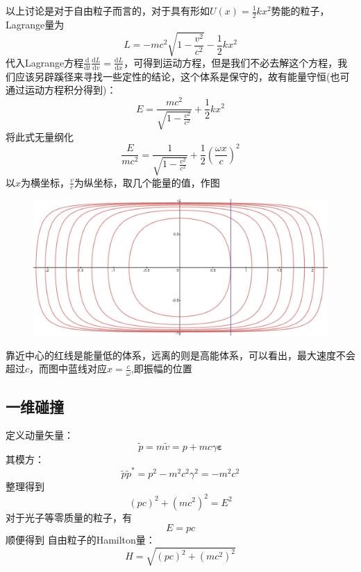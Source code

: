 \documentclass[hyperref,utf8]{ctexart}
\begin{document}
以上讨论是对于自由粒子而言的，对于具有形如$U(x)=\frac12 kx^2$势能的粒子，Lagrange量为\[L=-mc^2\sqrt{1-\frac{v^2}{c^2}}-\frac12 kx^2\]
代入Lagrange方程$\frac{\mathrm{d}}{\mathrm{d}t}\frac{\mathrm{d}L}{\mathrm{d}v}=\frac{\mathrm{d}L}{\mathrm{d}x}$，可得到运动方程，但是我们不必去解这个方程，我们应该另辟蹊径来寻找一些定性的结论，这个体系是保守的，故有能量守恒(也可通过运动方程积分得到)：
\[E=\frac{mc^2}{\sqrt{1-\frac{v^2}{c^2}}}+\frac12 kx^2\]
将此式无量纲化
\[\frac{E}{mc^2}=\frac{1}{\sqrt{1-\frac{v^2}{c^2}}}+ \frac12 (\frac{\omega x}{c})^2\]
以$x$为横坐标，$\frac{v}{c}$为纵坐标，取几个能量的值，作图
\begin{figure}[H]
    \centering
    \includegraphics[scale=0.4]{2020-08-26 224653.png}
\end{figure}
靠近中心的红线是能量低的体系，远离的则是高能体系，可以看出，最大速度不会超过$c$，而图中蓝线对应$x=\frac{c}{\omega}$,即振幅的位置
\subsection{一维碰撞}
定义动量矢量：\[\tilde{p}=m\tilde{v}=p+mc\gamma{\boldsymbol{\varepsilon}}\]其模方：\[\tilde{p}\tilde{p}^*=p^2-m^2c^2\gamma^2=-m^2c^2\]
整理得到\[(pc)^2+(mc^2)^2=E^2\]
对于光子等零质量的粒子，有\[E=pc\]顺便得到
自由粒子的Hamilton量：\[H=\sqrt{(pc)^2+(mc^2)^2}\]
\end{document}

